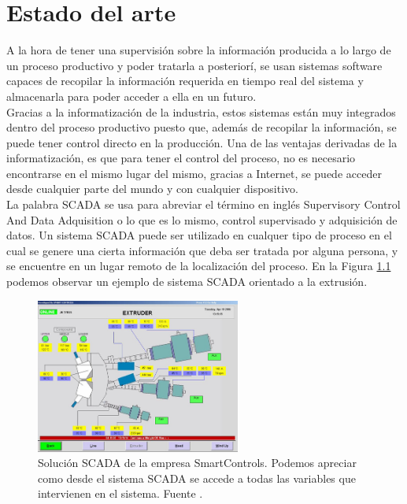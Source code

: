 
\chapter{Estado del arte}
\label{cap:estado}
A la hora de tener una supervisión sobre la información producida a lo largo de un proceso productivo y poder tratarla a posteriorí, se usan sistemas software capaces de recopilar la información requerida en tiempo real del sistema y almacenarla para poder acceder a ella en un futuro.\\

Gracias a la informatización de la industria, estos sistemas están muy integrados dentro del proceso productivo puesto que, además de recopilar la información, se puede tener control directo en la producción. Una de las ventajas derivadas de la informatización, es que para tener el control del proceso, no es necesario encontrarse en el mismo lugar del mismo, gracias a Internet, se puede acceder desde cualquier parte del mundo y con cualquier dispositivo.\\

La palabra SCADA se usa para abreviar el término en inglés Supervisory Control And Data Adquisition o lo que es lo mismo, control supervisado y adquisición de datos. Un sistema SCADA puede ser utilizado en cualquer tipo de proceso en el cual se genere una cierta información que deba ser tratada por alguna persona, y se encuentre en un lugar remoto de la localización del proceso. En la Figura \ref{fig:smart_Controls} podemos observar un ejemplo de sistema SCADA orientado a la extrusión.\\

\begin{figure}[h!]
    \centering
    \includegraphics[width=0.6\textwidth]{images/triplex-extruder.jpg}
    \caption[Solución SCADA de la empresa SmartControls.]{Solución SCADA de la empresa SmartControls. Podemos apreciar como desde el sistema SCADA se accede a todas las variables que intervienen en el sistema. Fuente \cite{smartcontrols}.}
    \label{fig:smart_Controls}
\end{figure}

